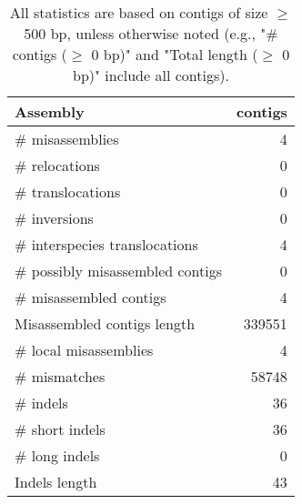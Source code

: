 \documentclass[12pt,a4paper]{article}
\begin{document}
\begin{table}[ht]
\begin{center}
\caption{All statistics are based on contigs of size $\geq$ 500 bp, unless otherwise noted (e.g., "\# contigs ($\geq$ 0 bp)" and "Total length ($\geq$ 0 bp)" include all contigs).}
\begin{tabular}{|l*{1}{|r}|}
\hline
Assembly & contigs \\ \hline
\# misassemblies & 4 \\ \hline
\hspace{5mm}\# relocations & 0 \\ \hline
\hspace{5mm}\# translocations & 0 \\ \hline
\hspace{5mm}\# inversions & 0 \\ \hline
\hspace{5mm}\# interspecies translocations & 4 \\ \hline
\# possibly misassembled contigs & 0 \\ \hline
\# misassembled contigs & 4 \\ \hline
Misassembled contigs length & 339551 \\ \hline
\# local misassemblies & 4 \\ \hline
\# mismatches & 58748 \\ \hline
\# indels & 36 \\ \hline
\hspace{5mm}\# short indels & 36 \\ \hline
\hspace{5mm}\# long indels & 0 \\ \hline
Indels length & 43 \\ \hline
\end{tabular}
\end{center}
\end{table}
\end{document}
